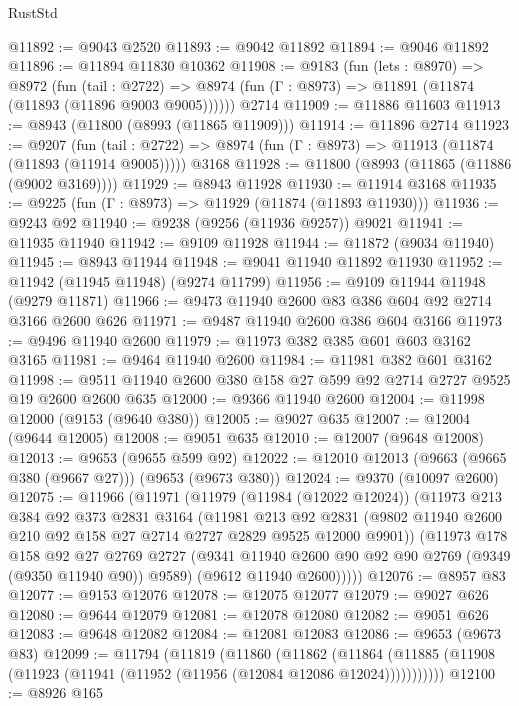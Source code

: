 \begin{lexlean}{RustStd}
\begin{coremodule}
{\begin{coremodule}
{{{{{{{{{{{{{{{{{{{{{{{{{{{{{{{{{{{{{{{@11892 := @9043 @2520
@11893 := @9042 @11892
@11894 := @9046 @11892
@11896 := @11894 @11830 @10362
@11908 := @9183
    (fun (lets : @8970) =>
    @8972
      (fun (tail : @2722) =>
      @8974 (fun (Γ : @8973) => @11891 (@11874 (@11893 (@11896 @9003 @9005))))))
    @2714
@11909 := @11886 @11603
@11913 := @8943 (@11800 (@8993 (@11865 @11909)))
@11914 := @11896 @2714
@11923 := @9207
    (fun (tail : @2722) => @8974 (fun (Γ : @8973) => @11913 (@11874 (@11893 (@11914 @9005)))))
    @3168
@11928 := @11800 (@8993 (@11865 (@11886 (@9002 @3169))))
@11929 := @8943 @11928
@11930 := @11914 @3168
@11935 := @9225 (fun (Γ : @8973) => @11929 (@11874 (@11893 @11930)))
@11936 := @9243 @92
@11940 := @9238 (@9256 (@11936 @9257)) @9021
@11941 := @11935 @11940
@11942 := @9109 @11928
@11944 := @11872 (@9034 @11940)
@11945 := @8943 @11944
@11948 := @9041 @11940 @11892 @11930
@11952 := @11942 (@11945 @11948) (@9274 @11799)
@11956 := @9109 @11944 @11948 (@9279 @11871)
@11966 := @9473 @11940 @2600 @83 @386 @604 @92 @2714 @3166 @2600 @626
@11971 := @9487 @11940 @2600 @386 @604 @3166
@11973 := @9496 @11940 @2600
@11979 := @11973 @382 @385 @601 @603 @3162 @3165
@11981 := @9464 @11940 @2600
@11984 := @11981 @382 @601 @3162
@11998 := @9511 @11940 @2600 @380 @158 @27 @599 @92 @2714 @2727 @9525 @19 @2600 @2600 @635
@12000 := @9366 @11940 @2600
@12004 := @11998 @12000 (@9153 (@9640 @380))
@12005 := @9027 @635
@12007 := @12004 (@9644 @12005)
@12008 := @9051 @635
@12010 := @12007 (@9648 @12008)
@12013 := @9653 (@9655 @599 @92)
@12022 := @12010 @12013 (@9663 (@9665 @380 (@9667 @27))) (@9653 (@9673 @380))
@12024 := @9370 (@10097 @2600)
@12075 := @11966
    (@11971
      (@11979
        (@11984 (@12022 @12024))
        (@11973
          @213
          @384
          @92
          @373
          @2831
          @3164
          (@11981
            @213
            @92
            @2831
            (@9802 @11940 @2600 @210 @92 @158 @27 @2714 @2727 @2829 @9525 @12000 @9901))
          (@11973
            @178
            @158
            @92
            @27
            @2769
            @2727
            (@9341 @11940 @2600 @90 @92 @90 @2769 (@9349 (@9350 @11940 @90)) @9589)
            (@9612 @11940 @2600)))))
@12076 := @8957 @83
@12077 := @9153 @12076
@12078 := @12075 @12077
@12079 := @9027 @626
@12080 := @9644 @12079
@12081 := @12078 @12080
@12082 := @9051 @626
@12083 := @9648 @12082
@12084 := @12081 @12083
@12086 := @9653 (@9673 @83)
@12099 := @11794
    (@11819
      (@11860
        (@11862
          (@11864 (@11885 (@11908 (@11923 (@11941 (@11952 (@11956 (@12084 @12086 @12024)))))))))))
@12100 := @8926 @165
}}}}}}}}}}}}}}}}}}}}}}}}}}}}}}}}}}}}}}}
\end{coremodule}}
\end{coremodule}
\end{lexlean}
